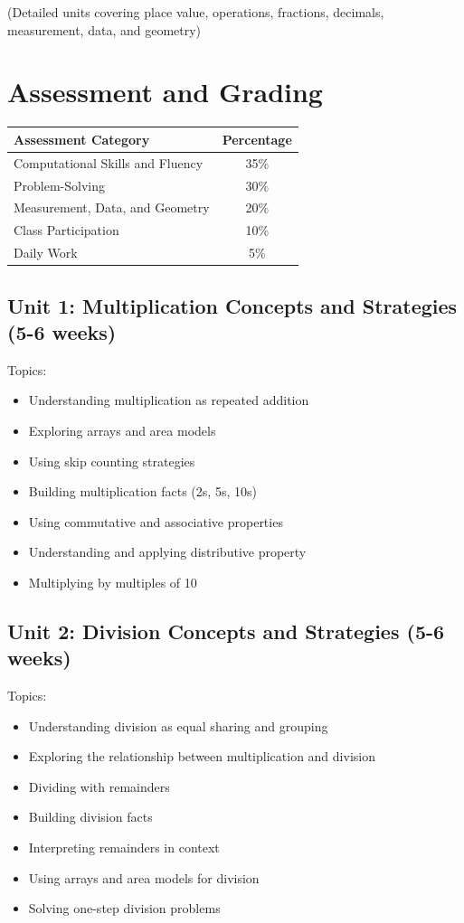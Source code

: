 \documentclass[11pt,letterpaper]{report}
\begin{document}
(Detailed units covering place value, operations, fractions, decimals, measurement, data, and geometry)

\section{Assessment and Grading}

\begin{center}
\begin{tabular}{|l|c|}
\hline
\textbf{Assessment Category} & \textbf{Percentage} \\
\hline
Computational Skills and Fluency & 35\% \\
\hline
Problem-Solving & 30\% \\
\hline
Measurement, Data, and Geometry & 20\% \\
\hline
Class Participation & 10\% \\
\hline
Daily Work & 5\% \\
\hline
\end{tabular}
\end{center}

\subsection{Unit 1: Multiplication Concepts and Strategies (5-6 weeks)}

Topics:
\begin{itemize}
\item Understanding multiplication as repeated addition
\item Exploring arrays and area models
\item Using skip counting strategies
\item Building multiplication facts (2s, 5s, 10s)
\item Using commutative and associative properties
\item Understanding and applying distributive property
\item Multiplying by multiples of 10
\end{itemize}

\subsection{Unit 2: Division Concepts and Strategies (5-6 weeks)}

Topics:
\begin{itemize}
\item Understanding division as equal sharing and grouping
\item Exploring the relationship between multiplication and division
\item Dividing with remainders
\item Building division facts
\item Interpreting remainders in context
\item Using arrays and area models for division
\item Solving one-step division problems
\end{itemize}
\end{document}
